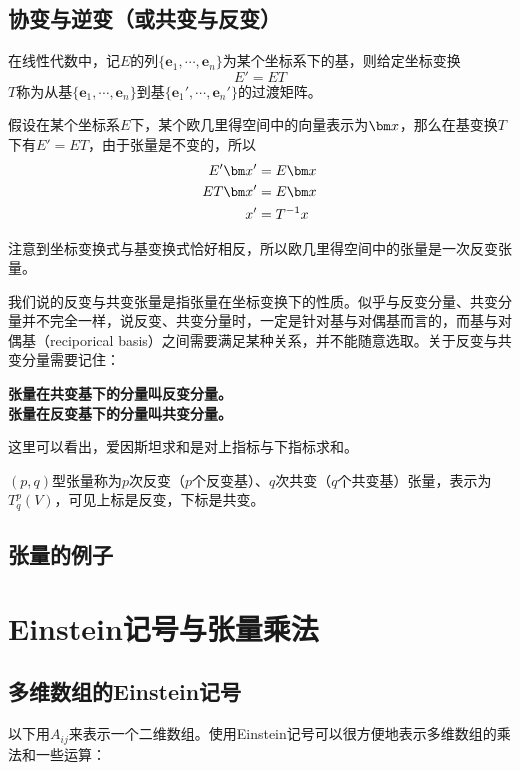 \subsection{协变与逆变（或共变与反变）}
在线性代数中，记$E$的列$\{\bm{e}_1,\cdots,\bm{e}_n\}$为某个坐标系下的基，则给定坐标变换
$$E'=ET$$
$T$称为从基$\{\bm{e}_1,\cdots,\bm{e}_n\}$到基$\{\bm{e}_1',\cdots,\bm{e}_n'\}$的过渡矩阵。

假设在某个坐标系$E$下，某个欧几里得空间中的向量表示为$\bx$，那么在基变换$T$下有$E'=ET$，由于张量是不变的，所以
\[
\begin{aligned}
E'\bx'&=E\bx\\
ET\bx'&=E\bx\\
x'&=T^{-1}x
\end{aligned}
\]

注意到坐标变换式与基变换式恰好相反，所以欧几里得空间中的张量是一次反变张量。

我们说的反变与共变张量是指张量在坐标变换下的性质。似乎与反变分量、共变分量并不完全一样，说反变、共变分量时，一定是针对基与对偶基而言的，而基与对偶基（reciporical basis）之间需要满足某种关系，并不能随意选取。关于反变与共变分量需要记住：
\begin{center}
\textbf{张量在共变基下的分量叫反变分量。}\\
\textbf{张量在反变基下的分量叫共变分量。}
\end{center}
这里可以看出，爱因斯坦求和是对上指标与下指标求和。

$(p,q)$型张量称为$p$次反变（$p$个反变基）、$q$次共变（$q$个共变基）张量，表示为$T^p_q(V)$，可见上标是反变，下标是共变。


\subsection{张量的例子}

\section{Einstein记号与张量乘法}
\subsection{多维数组的Einstein记号}
以下用$A_{ij}$来表示一个二维数组。使用Einstein记号可以很方便地表示多维数组的乘法和一些运算：

